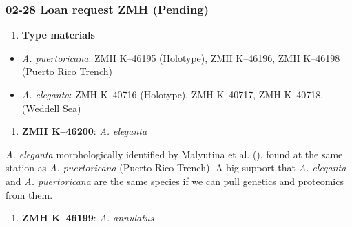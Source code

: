 \documentclass[
  man,
  longtable,
  nolmodern,
  notxfonts,
  notimes,
  colorlinks=true,linkcolor=blue,citecolor=blue,urlcolor=blue]{apa7}
\providecommand{\tightlist}{%
  \setlength{\itemsep}{0pt}\setlength{\parskip}{0pt}}
\begin{document}
\subsubsection{\texorpdfstring{\textbf{02-28} Loan request ZMH
(Pending)}{02-28 Loan request ZMH (Pending)}}\label{loan-request-zmh-pending}

\begin{enumerate}
\def\labelenumi{\arabic{enumi}.}
\tightlist
\item
  \textbf{Type materials}
\end{enumerate}

\begin{itemize}
\tightlist
\item
  \emph{A. puertoricana}: ZMH K--46195 (Holotype), ZMH K--46196, ZMH
  K--46198 (Puerto Rico Trench)
\item
  \emph{A. eleganta}: ZMH K--40716 (Holotype), ZMH K--40717, ZMH
  K--40718. (Weddell Sea)
\end{itemize}

\begin{enumerate}
\def\labelenumi{\arabic{enumi}.}
\setcounter{enumi}{1}
\tightlist
\item
  \textbf{ZMH K--46200}: \emph{A. eleganta}
\end{enumerate}

\emph{A. eleganta} morphologically identified by Malyutina et al.
(), found at the same station as
\emph{A. puertoricana} (Puerto Rico Trench). A big support that \emph{A.
eleganta} and \emph{A. puertoricana} are the same species if we can pull
genetics and proteomics from them.

\begin{enumerate}
\def\labelenumi{\arabic{enumi}.}
\setcounter{enumi}{2}
\tightlist
\item
  \textbf{ZMH K--46199}: \emph{A. annulatus}
\end{enumerate}
\end{document}
